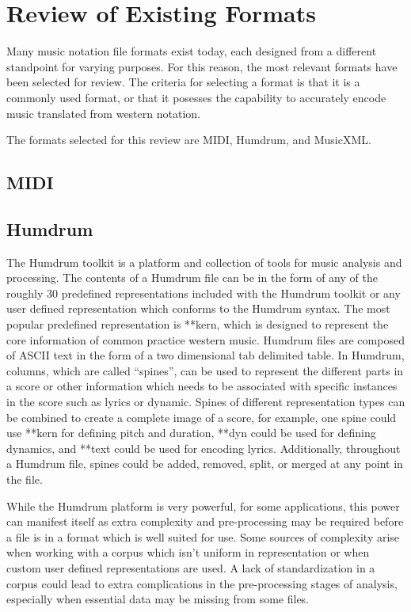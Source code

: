 
\section{Review of Existing Formats}

Many music notation file formats exist today, each designed from a different standpoint for varying purposes. For this reason, the most relevant formats have been selected for review. The criteria for selecting a format is that it is a commonly used format, or that it posesses the capability to accurately encode music translated from western notation.

The formats selected for this review are MIDI, Humdrum, and MusicXML.

\subsection{MIDI}

\subsection{Humdrum}

The Humdrum toolkit \citep*{Huro02,Huro97} is a platform and collection of tools for music analysis and processing. The contents of a Humdrum file can be in the form of any of the roughly 30 predefined representations included with the Humdrum toolkit or any user defined representation which conforms to the Humdrum syntax. The most popular predefined representation is **kern, which is designed to represent the core information of common practice western music. Humdrum files are composed of ASCII text in the form of a two dimensional tab delimited table. In Humdrum, columns, which are called ``spines'', can be used to represent the different parts in a score or other information which needs to be associated with specific instances in the score such as lyrics or dynamic. Spines of different representation types can be combined to create a complete image of a score, for example, one spine could use **kern for defining pitch and duration, **dyn could be used for defining dynamics, and **text could be used for encoding lyrics. Additionally, throughout a Humdrum file, spines could be added, removed, split, or merged at any point in the file.

While the Humdrum platform is very powerful, for some applications, this power can manifest itself as extra complexity and pre-processing may be required before a file is in a format which is well suited for use. Some sources of complexity arise when working with a corpus which isn't uniform in representation or when custom user defined representations are used. A lack of standardization in a corpus could lead to extra complications in the pre-processing stages of analysis, especially when essential data may be missing from some files.

